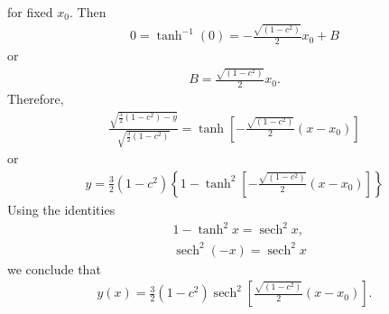 \documentclass[12pt,reqno]{amsart}
\numberwithin{equation}{section}  %
\def\sech{\operatorname{sech}}
\begin{document}
%
%
for fixed $x_{0}$. Then
%
%
\begin{equation*}
\begin{split}
  0 = \tanh^{-1}(0) = - \frac{\sqrt{(1-c^{2})}}{2}x_{0} + B
\end{split}
\end{equation*}
%
%
or
%
%
\begin{equation*}
\begin{split}
B = \frac{\sqrt{(1-c^{2})}}{2}x_{0}.
\end{split}
\end{equation*}
%
%
Therefore,
%
%
\begin{equation*}
\begin{split}
  \frac{\sqrt{\frac{3}{2}(1-c^{2}) - y}}{\sqrt{\frac{3}{2}(1-c^{2})}} =
  \tanh \left [- \frac{\sqrt{(1-c^{2})}}{2}(x -x_{0}) \right ] 
\end{split}
\end{equation*}
%
%
or
%
%
%
\begin{equation*}
\begin{split}
  y = \frac{3}{2}(1-c^{2}) \left \{ 1 - \tanh^{2} \left [- \frac{\sqrt{(1-c^{2})}}{2}(x -x_{0})
  \right ] \right \}
  \end{split}
\end{equation*}
%
%
Using the identities
%
%
\begin{equation*}
\begin{split}
  & 1 - \tanh^{2}x = \sech^{2}x,
  \\
  & \sech^{2}(-x) = \sech^{2}x
\end{split}
\end{equation*}
%
we conclude that
%
%
\begin{equation*}
\begin{split}
  y(x) = \frac{3}{2}(1-c^{2}) \sech^{2} \left [\frac{\sqrt{(1-c^{2})}}{2}(x -x_{0})
  \right ]. 
  \end{split}
\end{equation*}
%
%
%
%
%
%
%
%
%
\end{document}
